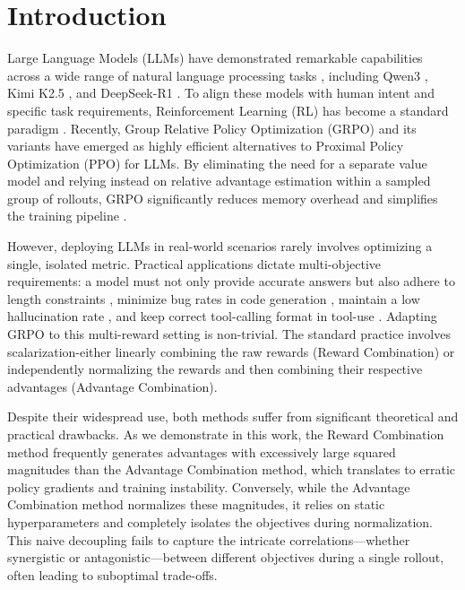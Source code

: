 \section{Introduction}
Large Language Models (LLMs) have demonstrated remarkable capabilities across a wide range of natural language processing tasks \citep{llm-survey}, including Qwen3 \citep{qwen3}, Kimi K2.5 \citep{k2.5}, and DeepSeek-R1 \citep{deepseek-r1}. To align these models with human intent and specific task requirements, Reinforcement Learning (RL) has become a standard paradigm \citep{rl-survey, sft-rl}. Recently, Group Relative Policy Optimization (GRPO) \citep{grpo} and its variants \citep{dapo, gspo, vcrl} have emerged as highly efficient alternatives to Proximal Policy Optimization (PPO) \citep{ppo} for LLMs. By eliminating the need for a separate value model and relying instead on relative advantage estimation within a sampled group of rollouts, GRPO significantly reduces memory overhead and simplifies the training pipeline \citep{liu2025part}.

However, deploying LLMs in real-world scenarios rarely involves optimizing a single, isolated metric. Practical applications dictate multi-objective requirements: a model must not only provide accurate answers but also adhere to length constraints \citep{efficient_survey1, efficient_survey2}, minimize bug rates in code generation \citep{DBLP:journals/ese/TambonDNKDA25, gao2025survey}, maintain a low hallucination rate \citep{hallucination_survey1, hallucination_survey2}, and keep correct tool-calling format in tool-use \citep{search_r1, airrag}. Adapting GRPO to this multi-reward setting is non-trivial. The standard practice involves scalarization-either linearly combining the raw rewards (Reward Combination) or independently normalizing the rewards and then combining their respective advantages (Advantage Combination).

Despite their widespread use, both methods suffer from significant theoretical and practical drawbacks. As we demonstrate in this work, the Reward Combination method frequently generates advantages with excessively large squared magnitudes than the Advantage Combination method, which translates to erratic policy gradients and training instability. Conversely, while the Advantage Combination method normalizes these magnitudes, it relies on static hyperparameters and completely isolates the objectives during normalization. This naive decoupling fails to capture the intricate correlations—whether synergistic or antagonistic—between different objectives during a single rollout, often leading to suboptimal trade-offs.

